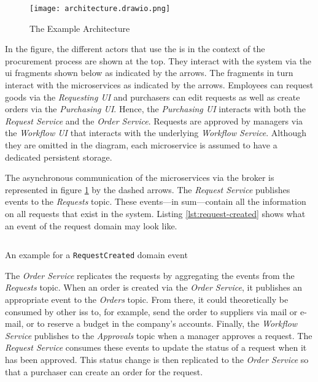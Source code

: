 \begin{figure}[H]
  \centering
  \texttt{[image: architecture.drawio.png]}
  \caption{The Example Architecture}\label{fig:example-architecture}
\end{figure}

In the figure, the different actors that use the \gls{is} in the context of the procurement process are shown at the top.
They interact with the system via the \gls{ui} fragments shown below as indicated by the arrows.
The fragments in turn interact with the microservices as indicated by the arrows.
Employees can request goods via the \emph{Requesting UI} and purchasers can edit requests as well as create orders via the \emph{Purchasing UI}.
Hence, the \emph{Purchasing UI} interacts with both the \emph{Request Service} and the \emph{Order Service}.
Requests are approved by managers via the \emph{Workflow UI} that interacts with the underlying \emph{Workflow Service}.
Although they are omitted in the diagram, each microservice is assumed to have a dedicated persistent storage.

The asynchronous communication of the microservices via the broker is represented in figure \ref{fig:example-architecture} by the dashed arrows.
The \emph{Request Service} publishes events to the \emph{Requests} topic.
These events---in sum---contain all the information on all requests that exist in the system.
Listing \ref{lst:request-created} shows what an event of the request domain may look like.

\begin{listing}[h]
  \inputminted{json}{assets/src/request-created.json}
  \caption{An example for a \texttt{RequestCreated} domain event}\label{lst:request-created}
\end{listing}

The \emph{Order Service} replicates the requests by aggregating the events from the \emph{Requests} topic.
When an order is created via the \emph{Order Service}, it publishes an appropriate event to the \emph{Orders} topic.
From there, it could theoretically be consumed by other \glspl{is} to, for example, send the order to suppliers via mail or e-mail, or to reserve a budget in the company's accounts.
Finally, the \emph{Workflow Service} publishes to the \emph{Approvals} topic when a manager approves a request.
The \emph{Request Service} consumes these events to update the status of a request when it has been approved.
This status change is then replicated to the \emph{Order Service} so that a purchaser can create an order for the request.

